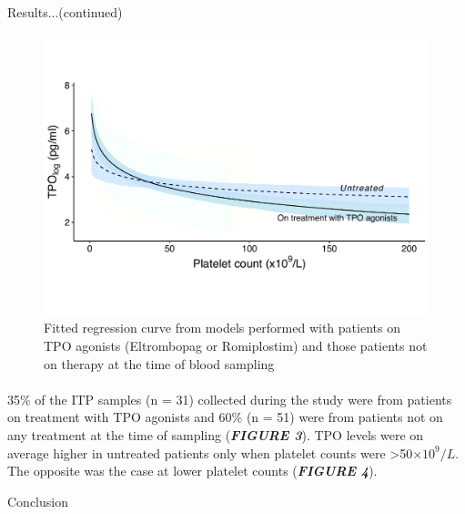 \documentclass[landscape,a0paper,fontscale=0.285]{beamer} %
\newlength{\onecolwid}
\begin{document}
\begin{frame}[t]
\begin{columns}[t]
\begin{column}{\onecolwid}
\begin{block}{Results...(continued)}
\paragraph{} 
\begin{figure}
\includegraphics[width=1\linewidth]{fig/treatment1.pdf}
\caption{Fitted regression curve from models performed with patients on TPO agonists (Eltrombopag or Romiplostim) and those patients not on therapy at the time of blood sampling}
\end{figure}


\paragraph{} 35\% of the ITP samples (n = 31) collected during the study were from patients on treatment with TPO agonists and 60\% (n = 51) were from patients not on any treatment at the time of sampling (\textbf{\emph{FIGURE 3}}). TPO levels were on average higher in untreated patients only when platelet counts were >50$\times 10^9/L$. The opposite was the case at lower platelet counts (\textbf{\emph{FIGURE 4}}).  

\end{block}


\begin{block}{Conclusion}


\end{block}
\end{column}
\end{columns}
\end{frame}
\end{document}
